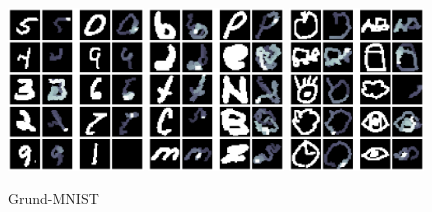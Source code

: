 \begin{figure}[!ht]
    \centering
    \includegraphics[width=0.32\textwidth]{images/resultate/base-mnist-mnist.png}
    \includegraphics[width=0.32\textwidth]{images/resultate/base-mnist-emnist.png}
    \includegraphics[width=0.32\textwidth]{images/resultate/base-mnist-quickdraw.png}
    \caption{Grund-MNIST}
    \label{fig:Grund-MNIST}
\end{figure}

